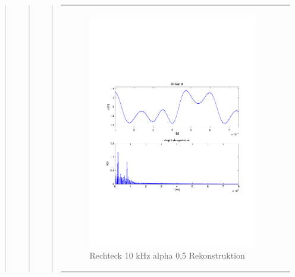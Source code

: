 \begin{quote}
\begin{quote}
\begin{quote}
\begin{center}
\begin{tabular}{ll}
            \hspace{-5cm}
                \begin{minipage}{0.6\textwidth}
                    \begin{figure}[H]
                        \includegraphics[scale=0.55, trim = 16mm 70mm 16mm 85mm, clip]{Bilder/flatrec10_05}
                          \caption{Rechteck 10 kHz alpha 0,5 Rekonstruktion}
		                  \label{fig:flatrec10_05}
                    \end{figure}
                \end{minipage}
                

\end{tabular}
\end{center}
\end{quote}
\end{quote}
\end{quote}
